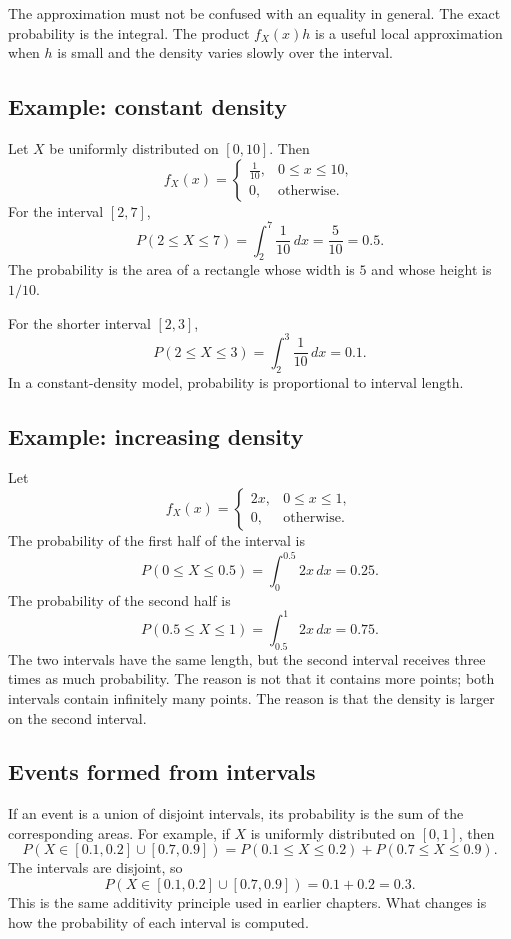The approximation must not be confused with an equality in general. The exact
probability is the integral. The product \(f_X(x)h\) is a useful local
approximation when \(h\) is small and the density varies slowly over the
interval.

\subsection*{Example: constant density}

Let \(X\) be uniformly distributed on \([0,10]\). Then
\[
f_X(x)=
\begin{cases}
\frac1{10}, & 0\leq x\leq 10,\\
0, & \text{otherwise}.
\end{cases}
\]
For the interval \([2,7]\),
\[
P(2\leq X\leq 7)=\int_2^7 \frac1{10}\,dx=\frac{5}{10}=0.5.
\]
The probability is the area of a rectangle whose width is \(5\) and whose height
is \(1/10\).

For the shorter interval \([2,3]\),
\[
P(2\leq X\leq 3)=\int_2^3 \frac1{10}\,dx=0.1.
\]
In a constant-density model, probability is proportional to interval length.

\subsection*{Example: increasing density}

Let
\[
f_X(x)=
\begin{cases}
2x, & 0\leq x\leq 1,\\
0, & \text{otherwise}.
\end{cases}
\]
The probability of the first half of the interval is
\[
P(0\leq X\leq 0.5)=\int_0^{0.5}2x\,dx=0.25.
\]
The probability of the second half is
\[
P(0.5\leq X\leq 1)=\int_{0.5}^{1}2x\,dx=0.75.
\]
The two intervals have the same length, but the second interval receives three
times as much probability. The reason is not that it contains more points; both
intervals contain infinitely many points. The reason is that the density is
larger on the second interval.

\subsection*{Events formed from intervals}

If an event is a union of disjoint intervals, its probability is the sum of the
corresponding areas. For example, if \(X\) is uniformly distributed on \([0,1]\),
then
\[
P(X\in[0.1,0.2]\cup[0.7,0.9])
=
P(0.1\leq X\leq 0.2)+P(0.7\leq X\leq 0.9).
\]
The intervals are disjoint, so
\[
P(X\in[0.1,0.2]\cup[0.7,0.9])=0.1+0.2=0.3.
\]
This is the same additivity principle used in earlier chapters. What changes is
how the probability of each interval is computed.

